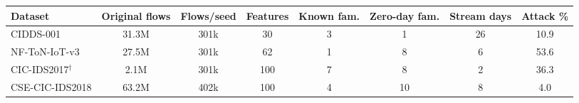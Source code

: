 \begin{tabular}{lccccccc}
\toprule
Dataset & Original flows & Flows/seed & Features & Known fam. & Zero-day fam. & Stream days & Attack \%\\
\midrule
CIDDS-001 & 31.3M & 301k & 30 & 3 & 1 & 26 & 10.9\\
NF-ToN-IoT-v3 & 27.5M & 301k & 62 & 1 & 8 & 6 & 53.6\\
CIC-IDS2017$^\dagger$ & 2.1M & 301k & 100 & 7 & 8 & 2 & 36.3\\
CSE-CIC-IDS2018 & 63.2M & 402k & 100 & 4 & 10 & 8 & 4.0\\
\bottomrule
\end{tabular}
